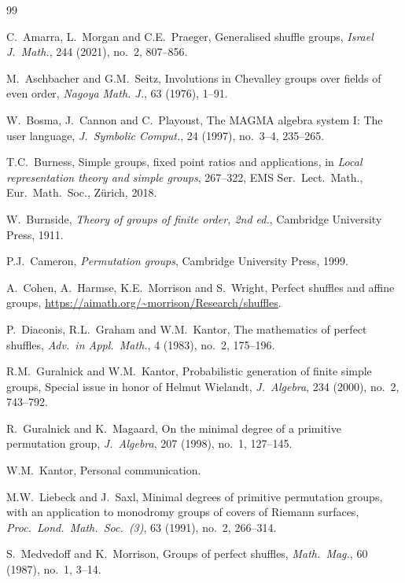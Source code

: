 \documentclass[11pt,a4paper,reqno]{amsart}
\theoremstyle{definition}
\begin{document}
\begin{thebibliography}{99}

  C.~Amarra, L.~Morgan and C.E.~Praeger,
  Generalised shuffle groups,
  \textit{Israel J.~Math.}, 244 (2021), no.~2, 807--856.

  M.~Aschbacher and G.M.~Seitz,
  Involutions in Chevalley groups over fields of even order,
  \emph{Nagoya Math. J.}, 63 (1976), 1--91.

  W.~Bosma, J.~Cannon and C.~Playoust,
  The MAGMA algebra system I: The user language,
  \emph{J.~Symbolic Comput.}, 24 (1997), no.~3--4, 235--265.

  T.C.~Burness,
  Simple groups, fixed point ratios and applications,
  in \emph{Local representation theory and simple groups}, 267--322, EMS Ser.~Lect.~Math.,
  Eur.~Math.~Soc., Z\"{u}rich, 2018.

  W.~Burnside,
  \textit{Theory of groups of finite order, 2nd ed.},
  Cambridge University Press, 1911.

  P.J.~Cameron,
  \textit{Permutation groups},
  Cambridge University Press, 1999.

  A.~Cohen, A.~Harmse, K.E.~Morrison and S.~Wright,
  Perfect shuffles and affine groups,
  \url{https://aimath.org/~morrison/Research/shuffles}.

  P.~Diaconis, R.L.~Graham and W.M.~Kantor,
  The mathematics of perfect shuffles,
  \textit{Adv.~in Appl.~Math.}, 4 (1983), no.~2, 175--196.


  R.M.~Guralnick and W.M.~Kantor,
  Probabilistic generation of finite simple groups, Special issue in honor of Helmut Wielandt,
  \textit{J.~Algebra}, 234 (2000), no.~2, 743--792.

  R.~Guralnick and K.~Magaard,
  On the minimal degree of a primitive permutation group,
  \textit{J.~Algebra}, 207 (1998), no.~1, 127--145.

  W.M.~Kantor, Personal communication.

  M.W.~Liebeck and J.~Saxl,
  Minimal degrees of primitive permutation groups, with an application to monodromy groups of covers of Riemann surfaces,
  \textit{Proc.~Lond.~Math.~Soc.~(3)}, 63 (1991), no.~2, 266--314.

  S.~Medvedoff and K.~Morrison,
  Groups of perfect shuffles,
  \textit{Math.~Mag.}, 60 (1987), no.~1, 3--14.

\end{thebibliography}

\end{document}
